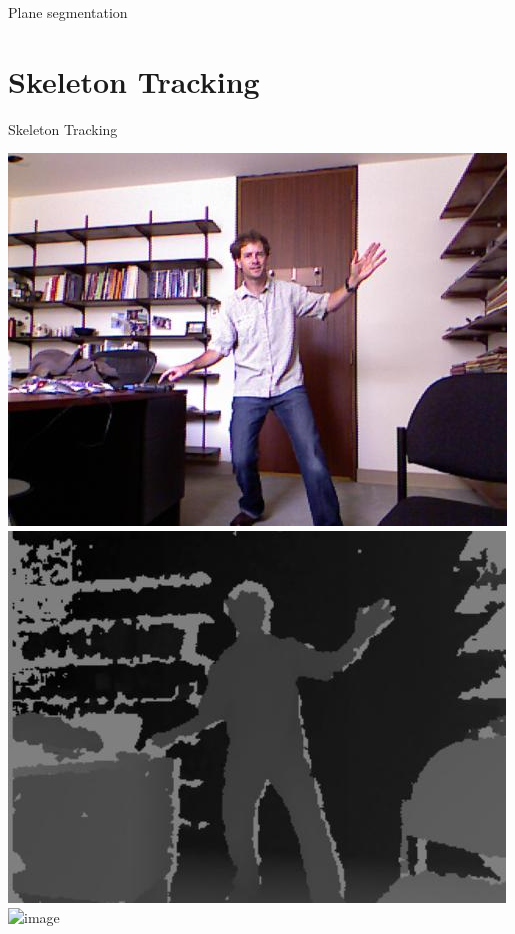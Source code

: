 \documentclass[compress]{beamer}
\begin{document}

\begin{frame}{Plane segmentation}
    \centering
\end{frame}


\section{Skeleton Tracking}


{
    \begin{frame}{Skeleton Tracking}

        \begin{center}
            \includegraphics[width=0.3\linewidth]{skeleton/skel3}
            \includegraphics[width=0.3\linewidth]{skeleton/skel2}
            \includegraphics<2>[width=0.3\linewidth]{skeleton/skel1}
        \end{center}
\end{frame}
}
\end{document}
